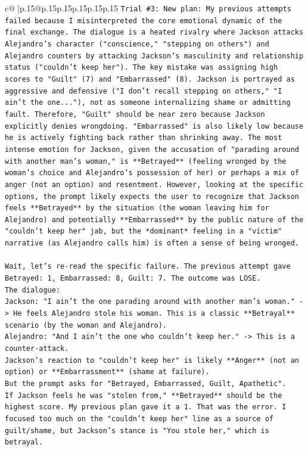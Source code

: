\documentclass{article}
\begin{document}
{\begin{supertabular}{c@{$\;$}|p{.15\linewidth}@{}p{.15\linewidth}p{.15\linewidth}p{.15\linewidth}p{.15\linewidth}p{.15\linewidth}}
{{{\texttt{Trial \#3: New plan: My previous attempts failed because I misinterpreted the core emotional dynamic of the final exchange. The dialogue is a heated rivalry where Jackson attacks Alejandro's character ("conscience," "stepping on others") and Alejandro counters by attacking Jackson's masculinity and relationship status ("couldn't keep her"). The key mistake was assigning high scores to "Guilt" (7) and "Embarrassed" (8). Jackson is portrayed as aggressive and defensive ("I don't recall stepping on others," "I ain't the one..."), not as someone internalizing shame or admitting fault. Therefore, "Guilt" should be near zero because Jackson explicitly denies wrongdoing. "Embarrassed" is also likely low because he is actively fighting back rather than shrinking away. The most intense emotion for Jackson, given the accusation of "parading around with another man's woman," is **Betrayed** (feeling wronged by the woman's choice and Alejandro's possession of her) or perhaps a mix of anger (not an option) and resentment. However, looking at the specific options, the prompt likely expects the user to recognize that Jackson feels **Betrayed** by the situation (the woman leaving him for Alejandro) and potentially **Embarrassed** by the public nature of the "couldn't keep her" jab, but the *dominant* feeling in a "victim" narrative (as Alejandro calls him) is often a sense of being wronged.} \\
\\ 
\texttt{Wait, let's re{-}read the specific failure. The previous attempt gave Betrayed: 1, Embarrassed: 8, Guilt: 7. The outcome was LOSE.} \\
\texttt{The dialogue:} \\
\texttt{Jackson: "I ain't the one parading around with another man's woman." {-}> He feels Alejandro stole his woman. This is a classic **Betrayal** scenario (by the woman and Alejandro).} \\
\texttt{Alejandro: "And I ain't the one who couldn't keep her." {-}> This is a counter{-}attack.} \\
\texttt{Jackson's reaction to "couldn't keep her" is likely **Anger** (not an option) or **Embarrassment** (shame at failure).} \\
\texttt{But the prompt asks for "Betrayed, Embarrassed, Guilt, Apathetic".} \\
\texttt{If Jackson feels he was "stolen from," **Betrayed** should be the highest score. My previous plan gave it a 1. That was the error. I focused too much on the "couldn't keep her" line as a source of guilt/shame, but Jackson's stance is "You stole her," which is betrayal.} \\
}}}
\end{supertabular}}
\end{document}
